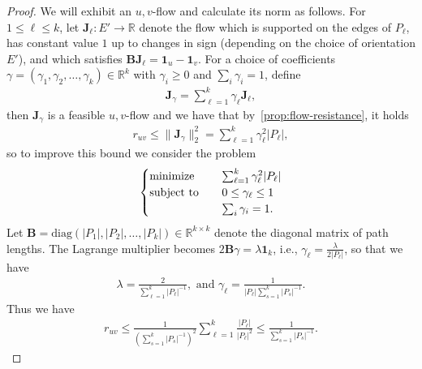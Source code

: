 \documentclass[11pt,a4paper]{amsart}
\begin{document}
\begin{proof}
    We will exhibit an $u, v$-flow and calculate its norm as follows. For $1\leq \ell\leq k$, let $\mathbf{J}_\ell:E'\rightarrow\mathbb{R}$ denote the flow which is supported on the edges of $P_\ell$, has constant value $1$ up to changes in sign (depending on the choice of orientation $E'$), and which satisfies $\mathbf{BJ}_\ell = \mathbf{1}_u - \mathbf{1}_v$. For a choice of coefficients $\gamma = (\gamma_1,\gamma_2,\dotsc, \gamma_k)\in\mathbb{R}^k$ with $\gamma_i\geq 0$ and $\sum_i \gamma_i = 1$, define
        \begin{align*}
            \mathbf{J}_\gamma = \sum_{\ell=1}^k \gamma_\ell \mathbf{J}_\ell,
        \end{align*}
    then $\mathbf{J}_\gamma$ is a feasible $u, v$-flow and we have that by~\cref{prop:flow-resistance}, it holds
        \begin{align*}
            r_{uv} \leq \|\mathbf{J}_\gamma\|_2^2 = \sum_{\ell=1}^k \gamma_\ell^2 |P_\ell|,
        \end{align*}
    so to improve this bound we consider the problem
        \begin{align*}
            \begin{cases}
            \text{minimize }\hspace{.25cm}& \sum_{\ell=1}^k \gamma_\ell^2 |P_\ell|\\
            \text{subject to }\hspace{.25cm}& 0\leq \gamma_\ell\leq 1\\
            & \sum_i \gamma_i = 1 .
            \end{cases}
        \end{align*}
    Let $\mathbf{B} = \mathrm{diag}(|P_1|, |P_2|,\dotsc, |P_k|)\in\mathbb{R}^{k\times k}$ denote the diagonal matrix of path lengths. The Lagrange multiplier becomes $2\mathbf{B}\gamma = \lambda\mathbf{1}_k$, i.e., $\gamma_\ell = \frac{\lambda}{2|P_\ell|}$, so that we have 
        \begin{align*}
            \lambda = \frac{2}{\sum_{\ell=1}^k |P_\ell|^{-1}},\text{ and }\gamma_\ell = \frac{1}{|P_\ell| \sum_{s=1}^k |P_s|^{-1}}.
        \end{align*}
    Thus we have
        \begin{align*}
            r_{uv} \leq \frac{1}{\left(\sum_{s=1}^k |P_s|^{-1}\right)^2}\sum_{\ell=1}^k \frac{|P_\ell|}{|P_\ell|^2} \leq \frac{1}{\sum_{s=1}^k |P_s|^{-1}}.
        \end{align*}
\end{proof}
\end{document}
